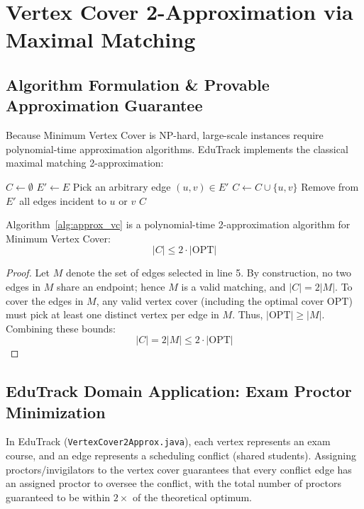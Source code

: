 \section{Vertex Cover 2-Approximation via Maximal Matching}
\subsection{Algorithm Formulation \& Provable Approximation Guarantee}
Because Minimum Vertex Cover is NP-hard, large-scale instances require polynomial-time approximation algorithms. EduTrack implements the classical maximal matching 2-approximation:
\begin{algorithm}[H]
\caption{Vertex Cover 2-Approximation via Maximal Matching}
\begin{algorithmic}[1]
    \State $C \gets \emptyset$ 
    \State $E' \gets E$
        \State Pick an arbitrary edge $(u, v) \in E'$
        \State $C \gets C \cup \{u, v\}$
        \State Remove from $E'$ all edges incident to $u$ or $v$
    \EndWhile
    \State \Return $C$
\EndFunction
\end{algorithmic}
\end{algorithm}

\begin{theorem}
Algorithm~\ref{alg:approx_vc} is a polynomial-time 2-approximation algorithm for Minimum Vertex Cover:
\begin{equation}
|C| \le 2 \cdot |\text{OPT}|
\end{equation}
\end{theorem}
\begin{proof}
Let $M$ denote the set of edges selected in line 5. By construction, no two edges in $M$ share an endpoint; hence $M$ is a valid matching, and $|C| = 2|M|$. To cover the edges in $M$, any valid vertex cover (including the optimal cover $\text{OPT}$) must pick at least one distinct vertex per edge in $M$. Thus, $|\text{OPT}| \ge |M|$. Combining these bounds:
\begin{equation}
|C| = 2|M| \le 2 \cdot |\text{OPT}|
\end{equation}
\end{proof}

\subsection{EduTrack Domain Application: Exam Proctor Minimization}
In EduTrack (\texttt{VertexCover2Approx.java}), each vertex represents an exam course, and an edge represents a scheduling conflict (shared students). Assigning proctors/invigilators to the vertex cover guarantees that every conflict edge has an assigned proctor to oversee the conflict, with the total number of proctors guaranteed to be within $2\times$ of the theoretical optimum.

